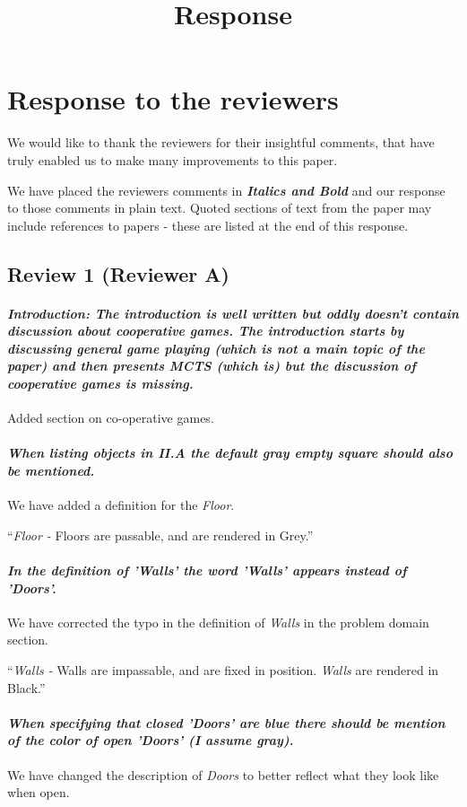 \documentclass{article}
\title{Response}
\begin{document}
\maketitle
\section{Response to the reviewers}
We would like to thank the reviewers for their insightful comments, that have truly enabled us to make many improvements to this paper.

We have placed the reviewers comments in \textit{\textbf{Italics and Bold}} and our response to those comments in plain text. Quoted sections of text from the paper may include references to papers - these are listed at the end of this response.

\subsection{Review 1 (Reviewer A)}
\paragraph*{\textit{Introduction: The introduction is well written but oddly doesn't contain discussion about cooperative games. The introduction starts by discussing general game playing (which is not a main topic of the paper) and then presents MCTS (which is) but the discussion of cooperative games is missing.}}
Added section on co-operative games.

\paragraph*{\textit{When listing objects in  II.A the default gray empty square should also be mentioned.}}
We have added a definition for the \emph{Floor}.

``\emph{Floor - } Floors are passable, and are rendered in Grey.''
\paragraph*{\textit{In the definition of 'Walls' the word 'Walls' appears instead of 'Doors'.}}
We have corrected the typo in the definition of \emph{Walls} in the problem domain section.

``\emph{Walls -} Walls are impassable, and are fixed in position. \emph{Walls} are rendered in Black.''
\paragraph*{\textit{When specifying that closed 'Doors' are blue there should be mention of the color of open 'Doors' (I assume gray).}}
We have changed the description of \emph{Doors} to better reflect what they look like when open.
\end{document}
